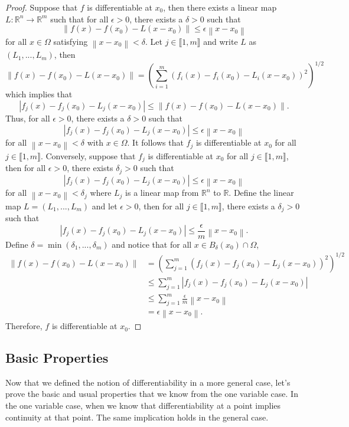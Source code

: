 \documentclass{article}
\theoremstyle{plain}
\theoremstyle{definition}
\newcommand{\R}{\mathbb{R}}
\newcommand{\Iint}[2]{\llbracket #1 , #2 \rrbracket}
\newcommand{\norm}[1]{\left\lVert#1 \right\rVert}
\begin{document}
\begin{proof}
    Suppose that $f$ is differentiable at $x_0$, then there exists a linear map $L : \R^n \to \R^m$ such that for all $\epsilon > 0$, there exists a $\delta > 0$ such that 
    $$\norm{f(x) - f(x_0) - L(x-x_0)} \leq \epsilon \norm{x - x_0}$$
    for all $x \in \Omega$ satisfying $\norm{x - x_0} < \delta$. Let $j \in \Iint{1}{m}$ and write $L$ as $(L_1, ..., L_m)$, then
    $$\norm{f(x) - f(x_0) - L(x-x_0)} = \left(\sum_{i=1}^{m}(f_i(x) - f_i(x_0) - L_i(x - x_0))^2\right)^{1/2}$$
    which implies that
    $$|f_j(x) - f_j(x_0) - L_j(x - x_0)| \leq \norm{f(x) - f(x_0) - L(x-x_0)}.$$
    Thus, for all $\epsilon > 0$, there exists a $\delta > 0$ such that 
    $$|f_j(x) - f_j(x_0) - L_j(x - x_0)| \leq \epsilon \norm{x - x_0}$$
    for all $\norm{x - x_0} < \delta$ with $x \in \Omega$. It follows that $f_j$ is differentiable at $x_0$ for all $j \in \Iint{1}{m}$. Conversely, suppose that $f_j$ is differentiable at $x_0$ for all $j \in \Iint{1}{m}$, then for all $\epsilon > 0$, there exists $\delta_j > 0$ such that 
    $$|f_j(x) - f_j(x_0) - L_j(x - x_0)| \leq \epsilon \norm{x - x_0}$$
    for all $\norm{x - x_0} < \delta_j$ where $L_j$ is a linear map from $\R^n$ to $\R$. Define the linear map $L = (L_1, ..., L_m)$ and let $\epsilon > 0$, then for all $j \in \Iint{1}{m}$, there exists a $\delta_j > 0$ such that 
    $$|f_j(x) - f_j(x_0) - L_j(x - x_0)| \leq \frac{\epsilon}{m}\norm{x - x_0}.$$
    Define $\delta = \min(\delta_1, ..., \delta_m)$ and notice that for all $x \in B_\delta(x_0)\cap \Omega$, 
    \begin{align*}
        \norm{f(x) - f(x_0) - L(x - x_0)} &= \left(\sum_{j=1}^{m}(f_j(x) - f_j(x_0) - L_j(x - x_0))^2\right)^{1/2} \\
        &\leq \sum_{j=1}^{m}|f_j(x) - f_j(x_0) - L_j(x - x_0)| \\
        &\leq \sum_{j=1}^{m}\frac{\epsilon}{m}\norm{x - x_0} \\
        &= \epsilon \norm{x - x_0}.
    \end{align*}
    Therefore, $f$ is differentiable at $x_0$.
\end{proof}

\subsection{Basic Properties}

Now that we defined the notion of differentiability in a more general case, let's prove the basic and usual properties that we know from the one variable case. In the one variable case, when we know that differentiability at a point implies continuity at that point. The same implication holds in the general case.
\end{document}
